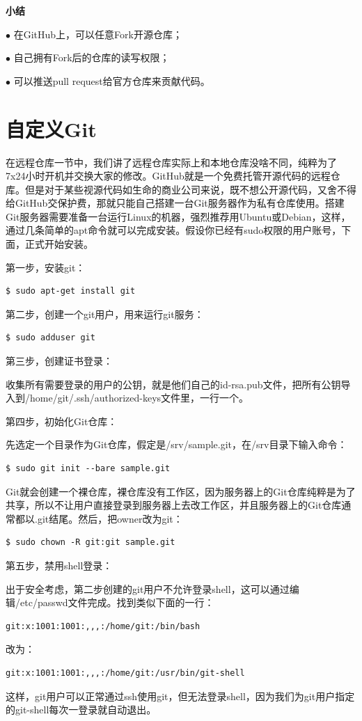 \documentclass[•]{article}
\begin{document}
\begin{CJK}{UTF8}{gbsn}
\textbf{小结}

$\bullet$ 在GitHub上，可以任意Fork开源仓库；

$\bullet$ 自己拥有Fork后的仓库的读写权限；

$\bullet$ 可以推送pull request给官方仓库来贡献代码。


\section{自定义Git}

\qquad 在远程仓库一节中，我们讲了远程仓库实际上和本地仓库没啥不同，纯粹为了7x24小时开机并交换大家的修改。GitHub就是一个免费托管开源代码的远程仓库。但是对于某些视源代码如生命的商业公司来说，既不想公开源代码，又舍不得给GitHub交保护费，那就只能自己搭建一台Git服务器作为私有仓库使用。搭建Git服务器需要准备一台运行Linux的机器，强烈推荐用Ubuntu或Debian，这样，通过几条简单的apt命令就可以完成安装。假设你已经有sudo权限的用户账号，下面，正式开始安装。

第一步，安装git：
\begin{lstlisting}
$ sudo apt-get install git
\end{lstlisting}
第二步，创建一个git用户，用来运行git服务：

\begin{lstlisting}
$ sudo adduser git
\end{lstlisting}

第三步，创建证书登录：

\qquad 收集所有需要登录的用户的公钥，就是他们自己的id-rsa.pub文件，把所有公钥导入到/home/git/.ssh/authorized-keys文件里，一行一个。

第四步，初始化Git仓库：

\qquad 先选定一个目录作为Git仓库，假定是/srv/sample.git，在/srv目录下输入命令：
\begin{lstlisting}
$ sudo git init --bare sample.git
\end{lstlisting}
\qquad Git就会创建一个裸仓库，裸仓库没有工作区，因为服务器上的Git仓库纯粹是为了共享，所以不让用户直接登录到服务器上去改工作区，并且服务器上的Git仓库通常都以.git结尾。然后，把owner改为git：
\begin{lstlisting}
$ sudo chown -R git:git sample.git
\end{lstlisting}
第五步，禁用shell登录：

\qquad 出于安全考虑，第二步创建的git用户不允许登录shell，这可以通过编辑/etc/passwd文件完成。找到类似下面的一行：
\begin{lstlisting}
git:x:1001:1001:,,,:/home/git:/bin/bash
\end{lstlisting}
改为：
\begin{lstlisting}
git:x:1001:1001:,,,:/home/git:/usr/bin/git-shell
\end{lstlisting}
\qquad 这样，git用户可以正常通过ssh使用git，但无法登录shell，因为我们为git用户指定的git-shell每次一登录就自动退出。


\end{CJK}
\end{document}

